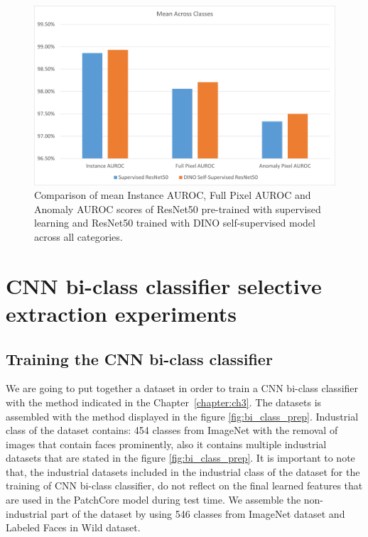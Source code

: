 \begin{figure}[t]
	\begin{center}
		\includegraphics[width=1.0\linewidth]{Chapter_4/dino.png}
	\end{center}
	\caption{Comparison of mean Instance AUROC, Full Pixel AUROC and Anomaly AUROC scores of ResNet50 pre-trained with supervised learning and ResNet50 trained with DINO self-supervised model across all categories.}
	\label{fig:dino_test}
\end{figure}

\section{CNN bi-class classifier selective extraction experiments}
\label{sec:comp_vis}

\subsection{Training the CNN bi-class classifier}
We are going to put together a dataset in order to train a CNN bi-class classifier with the method indicated in the Chapter~\ref{chapter:ch3}. The datasets is assembled with the method displayed in the figure \ref{fig:bi_class_prep}. Industrial class of the dataset contains: 454 classes from ImageNet with the removal of images that contain faces prominently, also it contains multiple industrial datasets that are stated in the figure \ref{fig:bi_class_prep}. It is important to note that, the industrial datasets included in the industrial class of the dataset for the training of CNN bi-class classifier, do not reflect on the final learned features that are used in the PatchCore model during test time. We assemble the non-industrial part of the dataset by using 546 classes from ImageNet dataset and Labeled Faces in Wild dataset.

